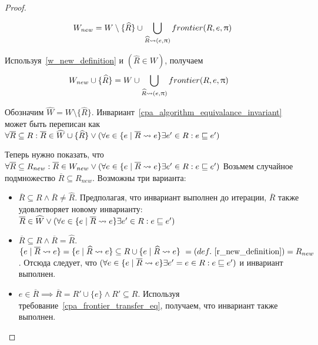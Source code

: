 \begin{proof}
\begin{enumerate}
\begin{itemize}
\begin{equation}
\label{w_new_definition}
\begin{aligned}
W_{new} = W \setminus \{\widehat{R}\} \cup \bigcup_{\widehat{R} \leadsto (e, \uppi)}{frontier(R, e, \uppi)}
\end{aligned}
\end{equation}

Используя~\ref{w_new_definition} и $(\widehat{R} \in W)$, получаем
\begin{equation}
\label{w_new_equation}
\begin{aligned}
& W_{new} \cup \{\widehat{R}\} = W \cup \bigcup_{\widehat{R} \leadsto (e, \uppi)}{frontier(R, e, \uppi)} 
\end{aligned}
\end{equation}

Обозначим $\widehat{W} = W \setminus \{\widehat{R}\}$. Инвариант~\ref{cpa_algorithm_equivalance_invariant} может быть переписан как
$\forall \overline{R} \subseteq R: \overline{R} \in \widehat{W} \cup \{\widehat{R}\} \lor (\forall e \in \{e \mid \overline{R} \leadsto e\} \exists e' \in R : e \sqsubseteq e') $

Теперь нужно показать, что
$\forall \overline{R} \subseteq R_{new}: \overline{R} \in W_{new} \lor(\forall e \in \{e \mid \overline{R} \leadsto e\} \exists e' \in R : e \sqsubseteq e') $
Возьмем случайное подмножество $\overline{R} \subseteq R_{new}$. Возможны три варианта:
\begin{itemize}
\item $\overline{R} \subseteq R \land \overline{R} \neq \widehat{R}$.
Предполагая, что инвариант выполнен до итерации, $\overline{R}$ также удовлетворяет новому инварианту: $\overline{R} \in \widehat{W} \lor (\forall e \in \{e \mid \overline{R} \leadsto e\} \exists e' \in R : e \sqsubseteq e') $

\item $\overline{R} \subseteq R \land \overline{R} = \widehat{R}$. $\{e \mid \overline{R} \leadsto e\}  = \{e \mid \widehat{R} \leadsto e\} \subseteq R \cup \{e \mid \widehat{R} \leadsto e\} \ = (def.~\ref{r_new_definition}) = R_{new}$. Отсюда следует, что $(\forall e \in \{e \mid \overline{R} \leadsto e\} \exists e' = e \in R : e \sqsubseteq e')$ и инвариант выполнен.

\item $e \in \overline{R} \implies \overline{R} = R' \cup \{e\} \land R' \subseteq R$. Используя требование~\ref{cpa_frontier_transfer_eq}, получаем, что инвариант также выполнен.
\end{itemize}


\end{itemize}
\end{enumerate}
\end{proof}
